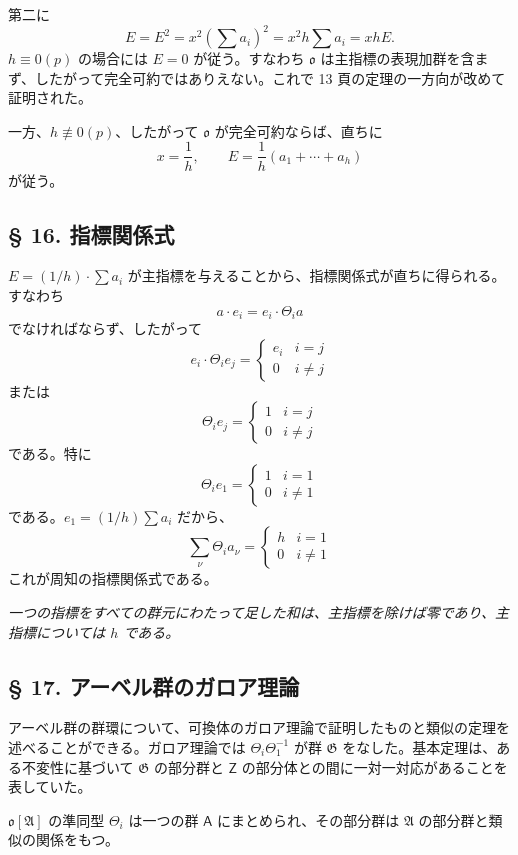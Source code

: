 第二に
\[
E=E^2=x^2\left(\sum a_i\right)^2=x^2h\sum a_i=xhE.
\]
$h\equiv0(p)$ の場合には $E=0$ が従う。すなわち $\mathfrak o$ は主指標の表現加群を含まず、したがって完全可約ではありえない。これで 13 頁の定理の一方向が改めて証明された。

一方、$h\not\equiv0(p)$、したがって $\mathfrak o$ が完全可約ならば、直ちに
\[
x=\frac{1}{h},\qquad E=\frac{1}{h}(a_1+\cdots+a_h)
\]
が従う。

\subsection*{§ 16. 指標関係式}\label{die-charakterenrelationen}

$E=(1/h)\cdot\sum a_i$ が主指標を与えることから、指標関係式が直ちに得られる。すなわち
\[a \cdot e_i = e_i \cdot \Theta_i a\]
でなければならず、したがって
\[e_i \cdot \Theta_i e_j = \begin{cases} e_i & i = j \\ 0 & i \neq j \end{cases}\]
または
\[\Theta_i e_j = \begin{cases} 1 & i = j \\ 0 & i \neq j \end{cases}\]
である。特に
\[\Theta_i e_1 = \begin{cases} 1 & i = 1 \\ 0 & i \neq 1 \end{cases}\]
である。$e_1=(1/h)\sum a_i$ だから、
\[
\sum_\nu \Theta_i a_\nu=\begin{cases} h & i=1\\ 0 & i\ne 1 \end{cases}
\]
これが周知の指標関係式である。

\emph{一つの指標をすべての群元にわたって足した和は、主指標を除けば零であり、主指標については $h$ である。}

\subsection*{§ 17. アーベル群のガロア理論}\label{die-galoissche-theorie-abelscher-gruppen}

アーベル群の群環について、可換体のガロア理論で証明したものと類似の定理を述べることができる。ガロア理論では $\Theta_i\Theta_1^{-1}$ が群 $\mathfrak G$ をなした。基本定理は、ある不変性に基づいて $\mathfrak G$ の部分群と $\mathsf{Z}$ の部分体との間に一対一対応があることを表していた。

$\mathfrak{o}[\mathfrak{A}]$ の準同型 $\Theta_i$ は一つの群 $\mathsf A$ にまとめられ、その部分群は $\mathfrak A$ の部分群と類似の関係をもつ。

